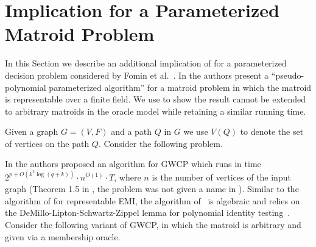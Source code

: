 \section{Implication for a Parameterized Matroid Problem}
\label{sec:additional}


In this Section we describe  an additional implication of  for a parameterized decision problem considered by Fomin et al.\ \cite{FGKSS23}. In \cite{FGKSS23} the authors present a ``pseudo-polynomial parameterized algorithm'' for a matroid problem in which the matroid is representable over a finite field. We use  to show the result cannot be extended to arbitrary matroids in the oracle model while retaining a similar running time. 


Given a graph $G=(V,F)$ and a path $Q$ in $G$ we use $V(Q)$ to denote the set of vertices on the path $Q$.   Consider the following problem.


In \cite{FGKSS23} the authors proposed an algorithm for GWCP which runs in time $2^{p+O(k^2 \log(q+k ))} \cdot n^{O(1)}\cdot T$, where $n$ is the number of vertices of the input graph (Theorem 1.5 in \cite{FGKSS23}, the problem was not given a name in \cite{FGKSS23}).  
Similar to the algorithm of \cite{CGM92} for representable EMI, the algorithm of~\cite{FGKSS23} is algebraic and relies on the DeMillo-Lipton-Schwartz-Zippel lemma for polynomial identity testing~\cite{Sc80,DL78,Zi79}.
 Consider the following variant of GWCP, in which the matroid is arbitrary and given via a membership oracle. 



